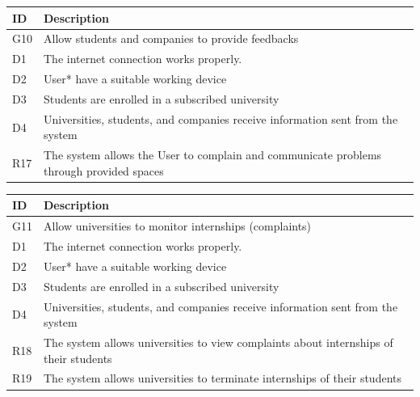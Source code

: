 \begin{center}
    \begin{longtable}{|l|p{13.5cm}|}
        \hline
        \rowcolor[HTML]{5C8A99}
        \textbf{ID} & \textbf{Description} \\ \hline
        \rowcolor[HTML]{E7E0FA} %
        G10 & Allow students and companies to provide feedbacks \\ \hline
        \rowcolor[HTML]{FFF9C4} %
        D1 & The internet connection works properly. \\ \hline
        \rowcolor[HTML]{FFF9C4} %
        D2 & User* have a suitable working device \\ \hline
        \rowcolor[HTML]{FFF9C4} %
        D3 & Students are enrolled in a subscribed university \\ \hline
        \rowcolor[HTML]{FFF9C4} %
        D4 & Universities, students, and companies receive information sent from the system \\ \hline
        \hline\rowcolor[HTML]{FFDAB9} %
        R17 & The system allows the User to complain and communicate problems through provided spaces \\ \hline
    \end{longtable}
\end{center}

\begin{center}
    \begin{longtable}{|l|p{13.5cm}|}
        \hline
        \rowcolor[HTML]{5C8A99}
        \textbf{ID} & \textbf{Description} \\ \hline
        \rowcolor[HTML]{E7E0FA} %
        G11 & Allow universities to monitor internships (complaints) \\ \hline
        \rowcolor[HTML]{FFF9C4} %
        D1 & The internet connection works properly. \\ \hline
        \rowcolor[HTML]{FFF9C4} %
        D2 & User* have a suitable working device \\ \hline
        \rowcolor[HTML]{FFF9C4} %
        D3 & Students are enrolled in a subscribed university \\ \hline
        \rowcolor[HTML]{FFF9C4} %
        D4 & Universities, students, and companies receive information sent from the system \\ \hline
        \hline\rowcolor[HTML]{FFDAB9} %
        R18 & The system allows universities to view complaints about internships of their students \\ \hline
        \hline\rowcolor[HTML]{FFDAB9} %
        R19 & The system allows universities to terminate internships of their students \\ \hline
    \end{longtable}
\end{center}

